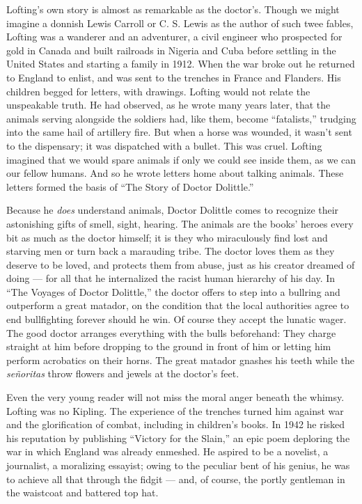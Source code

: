 Lofting's own story is almost as remarkable as the doctor's. Though we
might imagine a donnish Lewis Carroll or C. S. Lewis as the author of
such twee fables, Lofting was a wanderer and an adventurer, a civil
engineer who prospected for gold in Canada and built railroads in
Nigeria and Cuba before settling in the United States and starting a
family in 1912. When the war broke out he returned to England to enlist,
and was sent to the trenches in France and Flanders. His children begged
for letters, with drawings. Lofting would not relate the unspeakable
truth. He had observed, as he wrote many years later, that the animals
serving alongside the soldiers had, like them, become ``fatalists,''
trudging into the same hail of artillery fire. But when a horse was
wounded, it wasn't sent to the dispensary; it was dispatched with a
bullet. This was cruel. Lofting imagined that we would spare animals if
only we could see inside them, as we can our fellow humans. And so he
wrote letters home about talking animals. These letters formed the basis
of ``The Story of Doctor Dolittle.''

Because he \emph{does} understand animals, Doctor Dolittle comes to
recognize their astonishing gifts of smell, sight, hearing. The animals
are the books' heroes every bit as much as the doctor himself; it is
they who miraculously find lost and starving men or turn back a
marauding tribe. The doctor loves them as they deserve to be loved, and
protects them from abuse, just as his creator dreamed of doing --- for
all that he internalized the racist human hierarchy of his day. In ``The
Voyages of Doctor Dolittle,'' the doctor offers to step into a bullring
and outperform a great matador, on the condition that the local
authorities agree to end bullfighting forever should he win. Of course
they accept the lunatic wager. The good doctor arranges everything with
the bulls beforehand: They charge straight at him before dropping to the
ground in front of him or letting him perform acrobatics on their horns.
The great matador gnashes his teeth while the \emph{señoritas} throw
flowers and jewels at the doctor's feet.

Even the very young reader will not miss the moral anger beneath the
whimsy. Lofting was no Kipling. The experience of the trenches turned
him against war and the glorification of combat, including in children's
books. In 1942 he risked his reputation by publishing ``Victory for the
Slain,'' an epic poem deploring the war in which England was already
enmeshed. He aspired to be a novelist, a journalist, a moralizing
essayist; owing to the peculiar bent of his genius, he was to achieve
all that through the fidgit --- and, of course, the portly gentleman in
the waistcoat and battered top hat.

